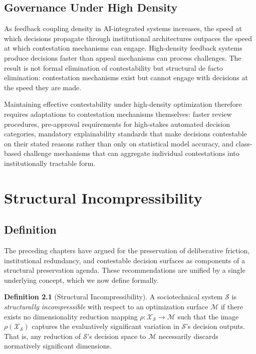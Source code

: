\documentclass[12pt, oneside]{book}
\theoremstyle{plain}
\theoremstyle{definition}
\newtheorem{definition}[theorem]{Definition}
\theoremstyle{remark}
\theoremstyle{definition}
\begin{document}
\section{Governance Under High Density}

As feedback coupling density in AI-integrated systems increases, the speed at which
decisions propagate through institutional architectures outpaces the speed at which
contestation mechanisms can engage. High-density feedback systems produce decisions
faster than appeal mechanisms can process challenges. The result is not formal
elimination of contestability but structural de facto elimination: contestation
mechanisms exist but cannot engage with decisions at the speed they are made.

Maintaining effective contestability under high-density optimization therefore
requires adaptations to contestation mechanisms themselves: faster review procedures,
pre-approval requirements for high-stakes automated decision categories, mandatory
explainability standards that make decisions contestable on their stated reasons rather
than only on statistical model accuracy, and class-based challenge mechanisms that
can aggregate individual contestations into institutionally tractable form.

\chapter{Structural Incompressibility}
\label{ch:incompressibility}

\section{Definition}

The preceding chapters have argued for the preservation of deliberative friction,
institutional redundancy, and contestable decision surfaces as components of a
structural preservation agenda. These recommendations are unified by a single
underlying concept, which we now define formally.

\begin{definition}[Structural Incompressibility]
\label{def:incompressible}
A sociotechnical system $\mathcal{S}$ is \emph{structurally incompressible} with
respect to an optimization surface $\mathcal{M}$ if there exists no dimensionality
reduction mapping $\rho: \mathcal{X}_\mathcal{S} \to \mathcal{M}$ such that the
image $\rho(\mathcal{X}_\mathcal{S})$ captures the evaluatively significant
variation in $\mathcal{S}$'s decision outputs. That is, any reduction of
$\mathcal{S}$'s decision space to $\mathcal{M}$ necessarily discards normatively
significant dimensions.
\end{definition}
\end{document}
